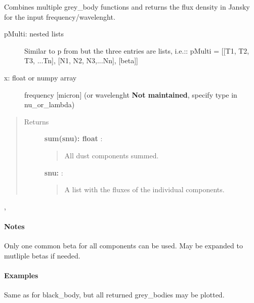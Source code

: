 \documentclass[a4paper,10pt,english]{sphinxmanual}
\begin{document}
\begin{fulllineitems}
\label{functions:astrolyze.functions.astro_functions.multi_component_grey_body}
Combines multiple grey\_body functions and returns the flux density in
Jansky for the input frequency/wavelenght.
\begin{description}
\item[{pMulti: nested lists}] \leavevmode
Similar to p from
 but the three entries are
lists, i.e.::
pMulti = {[}{[}T1, T2, T3, ...Tn{]}, {[}N1, N2, N3,...Nn{]}, {[}beta{]}{]}

\item[{x: float or numpy array}] \leavevmode
frequency {[}micron{]} (or wavelenght \textbf{Not maintained}, specify type in
nu\_or\_lambda)

\end{description}
\begin{quote}\begin{description}
\item[{Returns }] \leavevmode
\textbf{sum(snu): float} :
\begin{quote}

All dust components summed.
\end{quote}

\textbf{snu:} :
\begin{quote}

A list with the fluxes of the individual components.
\end{quote}

\end{description}\end{quote}




{\hyperref[functions:astrolyze.functions.astro_functions.black_body]{}}, {\hyperref[functions:astrolyze.functions.astro_functions.grey_body]{}}


\paragraph{Notes}

Only one common beta for all components can be used. May be expanded to
mutliple betas if needed.
\paragraph{Examples}

Same as for black\_body, but all returned grey\_bodies may be plotted.

\end{fulllineitems}
\end{document}
